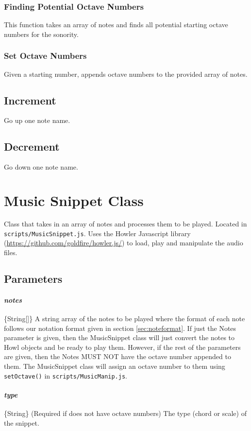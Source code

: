 \documentclass{article}
\begin{document}
\subsubsection{Finding Potential Octave Numbers}
This function takes an array of notes and finds all potential starting octave numbers for the sonority.

\subsubsection{Set Octave Numbers}
Given a starting number, appends octave numbers to the provided array of notes.

\subsection{Increment}
Go up one note name.

\subsection{Decrement}
Go down one note name.

\section{Music Snippet Class}
Class that takes in an array of notes and processes them to be played. Located in \texttt{scripts/MusicSnippet.js}. Uses the Howler Javascript library (\url{https://github.com/goldfire/howler.js/}) to load, play and manipulate the audio files.
\subsection{Parameters}
\paragraph{\textit{notes}} \{String[]\} A string array of the notes to be played where the format of each note follows our notation format given in section \ref{sec:noteformat}. If just the Notes parameter is given, then the MusicSnippet class will just convert the notes to Howl objects and be ready to play them. However, if the rest of the parameters are given, then the Notes MUST NOT have the octave number appended to them. The MusicSnippet class will assign an octave number to them using \texttt{setOctave()} in \texttt{scripts/MusicManip.js}.
\paragraph{\textit{type}} \{String\} (Required if  does not have octave numbers) The type (chord or scale) of the snippet.
\end{document}
